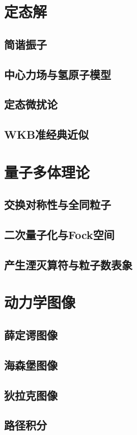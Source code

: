 \documentclass[a4paper]{report}
\begin{document}
\chapter{定态解}
\section{简谐振子}
\section{中心力场与氢原子模型}
\section{定态微扰论}
\section{WKB准经典近似}

\chapter{量子多体理论}
\section{交换对称性与全同粒子}
\section{二次量子化与Fock空间}
\section{产生湮灭算符与粒子数表象}

\chapter{动力学图像}
\section{薛定谔图像}
\section{海森堡图像}
\section{狄拉克图像}
\section{路径积分}
\end{document}
